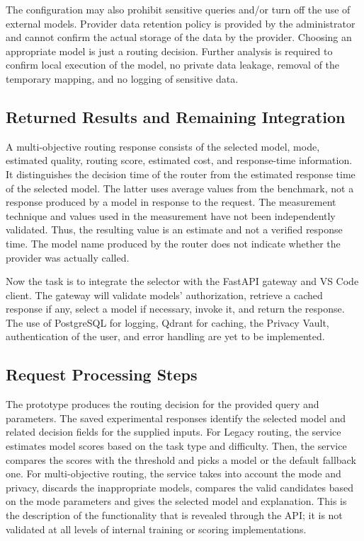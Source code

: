 The configuration may also prohibit sensitive queries and/or turn off the use of external models. Provider data retention policy is provided by the administrator and cannot confirm the actual storage of the data by the provider. Choosing an appropriate model is just a routing decision. Further analysis is required to confirm local execution of the model, no private data leakage, removal of the temporary mapping, and no logging of sensitive data.

\subsection{Returned Results and Remaining Integration}
A multi-objective routing response consists of the selected model, mode, estimated quality, routing score, estimated cost, and response-time information. It distinguishes the decision time of the router from the estimated response time of the selected model. The latter uses average values from the benchmark, not a response produced by a model in response to the request. The measurement technique and values used in the measurement have not been independently validated. Thus, the resulting value is an estimate and not a verified response time. The model name produced by the router does not indicate whether the provider was actually called.

Now the task is to integrate the selector with the FastAPI gateway and VS Code client. The gateway will validate models' authorization, retrieve a cached response if any, select a model if necessary, invoke it, and return the response. The use of PostgreSQL for logging, Qdrant for caching, the Privacy Vault, authentication of the user, and error handling are yet to be implemented.

\subsection{Request Processing Steps}
The prototype produces the routing decision for the provided query and parameters. The saved experimental responses identify the selected model and related decision fields for the supplied inputs. For Legacy routing, the service estimates model scores based on the task type and difficulty. Then, the service compares the scores with the threshold and picks a model or the default fallback one. For multi-objective routing, the service takes into account the mode and privacy, discards the inappropriate models, compares the valid candidates based on the mode parameters and gives the selected model and explanation. This is the description of the functionality that is revealed through the API; it is not validated at all levels of internal training or scoring implementations.

